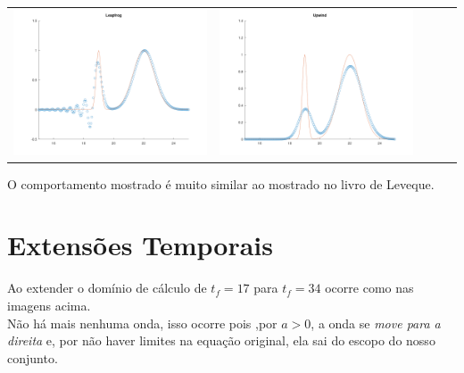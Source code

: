 \documentclass{article}
\begin{document}
\begin{table}
\begin{tabular}{ccccc}
            \includegraphics[scale = 0.17]{Leapfrog.png} & \includegraphics[scale = 0.17]{Upwind.png}
        \end{tabular}
    \label{tbl:table_of_figures}
\end{table}

O comportamento mostrado é muito similar ao mostrado no livro de Leveque.
\newpage
\section{Extensões Temporais}

Ao extender o domínio de cálculo de $t_f=17$ para $t_f=34$ ocorre como nas imagens acima.\\
Não há mais nenhuma onda, isso ocorre pois ,por $a>0$, a onda se \textit{move para a direita} e, por não haver limites na equação original, ela sai do escopo do nosso conjunto.\\
\end{document}
